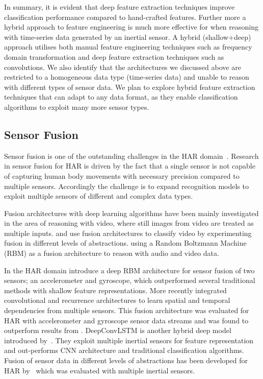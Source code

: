 \documentclass[runningheads]{llncs}
\begin{document}
In summary, it is evident that deep feature extraction techniques improve classification performance compared to hand-crafted features. Further more a hybrid approach to feature engineering is much more effective for when reasoning with time-series data generated by an inertial sensor. A hybrid (shallow+deep) approach utilises both manual feature engineering techniques such as frequency domain transformation and deep feature extraction techniques such as convolutions. We also identify that the architectures we discussed above are restricted to a homogeneous data type (time-series data) and unable to reason with different types of sensor data. We plan to explore hybrid feature extraction techniques that can adapt to any data format, as they enable classification algorithms to exploit many more sensor types.

\subsection{Sensor Fusion}
Sensor fusion is one of the outstanding challenges in the HAR domain~\cite{wang2018deep,baltruvsaitis2018multimodal}. Research in sensor fusion for HAR is driven by the fact that a single sensor is not capable of capturing human body movements with necessary precision compared to multiple sensors. Accordingly the challenge is to expand recognition models to exploit multiple sensors of different and complex data types.

Fusion architectures with deep learning algorithms have been mainly investigated in the area of reasoning with video, where still images from video are treated as multiple inputs. \cite{karpathy2014large} and \cite{pigou2015beyond} use fusion architectures to classify video by experimenting fusion in different levels of abstractions. \cite{ngiam2011multimodal} using a Random Boltzmann Machine (RBM) as a fusion architecture to reason with audio and video data. 

In the HAR domain \cite{radu2016towards} introduce a deep RBM architecture for sensor fusion of two sensors; an accelerometer and gyroscope, which outperformed several traditional methods with shallow feature representations. More recently \cite{yao2017deepsense} integrated convolutional and recurrence architectures to learn spatial and temporal dependencies from multiple sensors. This fusion architecture was evaluated for HAR with accelerometer and gyroscope sensor data streams and was found to outperform results from \cite{radu2016towards}. DeepConvLSTM is another hybrid deep model introduced by~\cite{ordonez2016deep}. They exploit multiple inertial sensors for feature representation and out-performs CNN architecture and traditional classification algorithms. Fusion of sensor data in different levels of abstractions has been developed for HAR by~\cite{munzner2017cnn} which was evaluated with multiple inertial sensors. 
\end{document}
